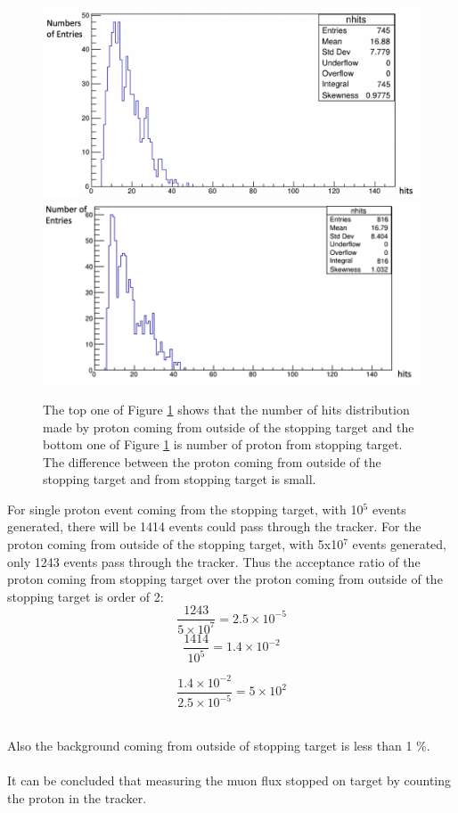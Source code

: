 \documentclass[12pt]{extarticle}
\begin{document}
\begin{figure}[H]
\centering
\includegraphics[width=0.8\linewidth]{figure/proton_oot_timecluster.png}
\includegraphics[width=0.81\linewidth]{figure/proton_stopped_target_timecluster.png}
\caption{The top one of Figure \ref{timecluster} shows that the number of hits distribution made by proton coming from outside of the stopping target and the bottom one of Figure \ref{timecluster} is number of proton from stopping target. The difference between the proton coming from outside of the stopping target and from stopping target is small.
}
\label{timecluster}
\end{figure}
\noindent 

\noindent For single proton event coming from the stopping target, with 10$^5$ events generated, there will be 1414 events could pass through the tracker. For the proton coming from outside of the stopping target, with 5x10$^7$ events generated, only 1243 events pass through the tracker. Thus the acceptance ratio of the proton coming from stopping target over the proton coming from outside of the stopping target is order of 2:
 \[   
 \frac{ 1243 }{ 5\times10^{7}}= 2.5\times10^{-5}
\]
\[
     \frac{ 1414 }{10^{5}} = 1.4\times10^{-2}
\]

\[
     \frac{ 1.4\times10^{-2} }{ 2.5\times10^{-5}} = 5\times10^{2} 
\]


\\Also the background coming from outside of stopping target  is less than 1 \%. \\
\\It can be concluded that measuring the muon flux stopped on target by counting the proton in the tracker.
\end{document}
